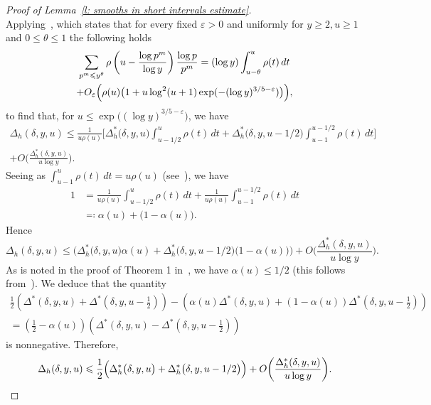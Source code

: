 \documentclass[12pt,a4paper,reqno]{amsart}
\numberwithin{equation}{section}
\def\leq {\leqslant}
\theoremstyle{remark}
\theoremstyle{definition}
\numberwithin{equation}{section}
\theoremstyle{remark}
\begin{document}
\begin{proof}[Proof of Lemma~\ref{l: smooths in short intervals estimate}]
\[\]
Applying~\cite[Lemma~4]{Hildebrand}, which states that for every fixed $\varepsilon>0$ and uniformly for $y \geq 2, u \geq 1$ and $0 \leq \theta \leq 1$ the following holds
\begin{multline*}
\sum_{p^m \leq y^{\theta}} \rho\left(u-\frac{\log p^m}{\log y}\right) \frac{\log p}{p^m} =(\log y) \int_{u-\theta}^u \rho(t) \, d t \\
+ O_{\varepsilon}\Bigl( \rho(u) \bigl( 1+u \log ^2(u+1) \exp (-(\log y)^{3 / 5-\varepsilon} ) \bigr) \Bigr)  ,
\end{multline*}
to find that, for $u \leq \exp \bigl( (\log y)^{3/5 - \varepsilon} \bigr)$, we have
\begin{multline*}
\Delta_h (\delta,y,u) \leq \frac{1}{u \rho(u)} \biggl[ \Delta_h^* \bigl( \delta, y, u \bigr)  \int_{u - 1/2}^{u} \rho (t) \, dt 
+ \Delta_h^* \bigl( \delta, y, u - 1/2 \bigr) \int_{u-1}^{u-1/2} \rho (t) \, dt \biggr] \\ +  O \biggl( \frac{\Delta_h^* (\delta, y, u)}{u \log y} \biggr) . 
\end{multline*}
Seeing as $\int_{u-1}^u \rho (t) \, dt = u \rho(u)$ (see~\cite[Lemma~1]{Hildebrand}), we have
\begin{align*}
1 & = \frac{1}{u \rho (u)} \int_{u-1/2}^{u} \rho(t) \, dt + \frac{1}{u \rho (u)} \int_{u-1}^{u-1/2} \rho(t) \, dt \\
& \eqqcolon \alpha (u) + \bigl( 1 - \alpha (u) \bigr).
\end{align*}
Hence
\[
\Delta_h (\delta,y,u) \leq \biggl( \Delta_h^* \bigl( \delta, y, u \bigr) \alpha (u) +  \Delta_h^* \bigl( \delta, y, u - 1/2 \bigr) \bigl( 1 - \alpha (u) \bigr) \biggr) + O \biggl( \frac{\Delta_h^* (\delta, y, u)}{u \log y} \biggr) . 
\]
As is noted in the proof of Theorem 1 in~\cite{Hildebrand}, we have $\alpha (u) \leq 1/2$ (this follows from~\cite[Lemma~1]{Hildebrand}). We deduce that the quantity
\begin{multline*}
\frac{1}{2}\left(\Delta^*(\delta, y, u)+\Delta^*\left(\delta, y, u-\frac{1}{2}\right)\right)-\left(\alpha(u) \Delta^*(\delta, y, u)+(1-\alpha(u)) \Delta^*\left(\delta, y, u-\frac{1}{2}\right)\right) \\
=\left(\frac{1}{2}-\alpha(u)\right)\left(\Delta^*(\delta, y, u)-\Delta^*\left(\delta, y, u-\frac{1}{2}\right)\right)
\end{multline*}
is nonnegative. Therefore,
\[
\Delta_h (\delta,y,u) \leq \frac{1}{2} \Bigl( \Delta_h^* \bigl( \delta, y, u \bigr) + \Delta_h^* \bigl( \delta, y, u - 1/2 \bigr) \Bigr) +  O \biggl( \frac{\Delta_h^* (\delta, y, u)}{u \log y} \biggr).
\]
\end{proof}
\end{document}
